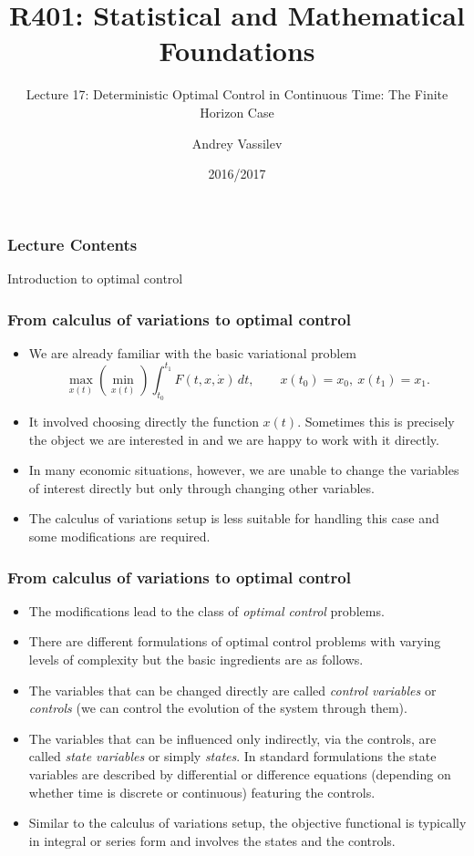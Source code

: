 \documentclass[10pt]{beamer}
\title{R401: Statistical and Mathematical Foundations}
\subtitle{Lecture 17: Deterministic Optimal Control in Continuous Time: The Finite Horizon Case}
\author{Andrey Vassilev}
\date{2016/2017}
\theoremstyle{definition}
\begin{document}
\maketitle



\begin{frame}[fragile]
\frametitle{Lecture Contents}
\tableofcontents
\end{frame}

\begin{section}{Introduction to optimal control}\label{sec:intr}

\begin{frame}[fragile]
\frametitle{From calculus of variations to optimal control}
\begin{itemize}\itemsep1em
\item We are already familiar with the basic variational problem
\[ \max_{x(t)} \left(\min_{x(t)}\right) \int_{t_0}^{t_1}F(t,x,\dot{x})\,dt, \qquad x(t_0)=x_0,~x(t_1)=x_1. \]
\item It involved choosing directly the function $ x(t) $. Sometimes this is precisely the object we are interested in and we are happy to work with it directly.
\item In many economic situations, however, we are unable to change the variables of interest directly but only through changing other variables.
\item The calculus of variations setup is less suitable for handling this case and some modifications are required.
\end{itemize}
\end{frame}

\begin{frame}[fragile]
\frametitle{From calculus of variations to optimal control}
\begin{itemize}\itemsep1em
\item The modifications lead to the class of \emph{optimal control} problems.
\item There are different formulations of optimal control problems with varying levels of complexity but the basic ingredients are as follows.
\item The variables that can be changed directly are called \emph{control variables} or \emph{controls} (we can control the evolution of the system through them).
\item The variables that can be influenced only indirectly, via the controls, are called \emph{state variables} or simply \emph{states}. In standard formulations the state variables are described by differential or difference equations (depending on whether time is discrete or continuous) featuring the controls.
\item Similar to the calculus of variations setup, the objective functional is typically in integral or series form and involves the states and the controls.
\end{itemize}\bigskip


\end{frame}
\end{section}
\end{document}
